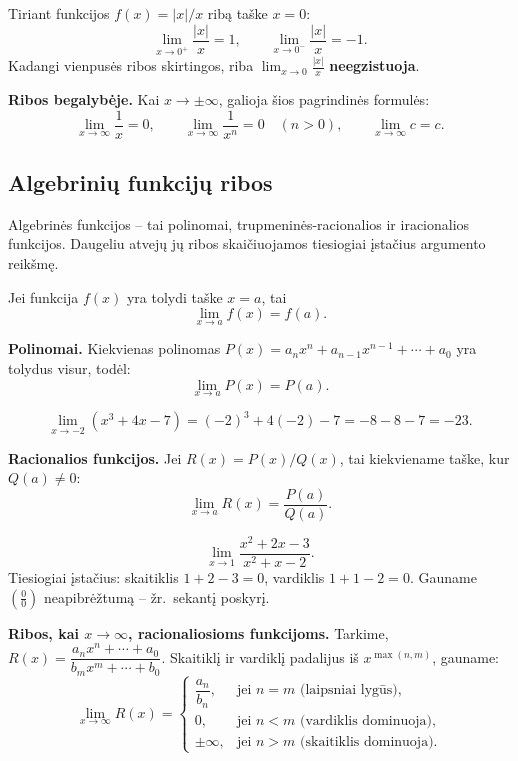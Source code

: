 \begin{example}
Tiriant funkcijos $f(x) = |x|/x$ ribą taške $x = 0$:
\[
  \lim_{x \to 0^+} \frac{|x|}{x} = 1, \qquad \lim_{x \to 0^-} \frac{|x|}{x} = -1.
\]
Kadangi vienpusės ribos skirtingos, riba $\lim_{x \to 0} \frac{|x|}{x}$ \textbf{neegzistuoja}.
\end{example}

\textbf{Ribos begalybėje.} Kai $x \to \pm\infty$, galioja šios pagrindinės formulės:
\[
  \lim_{x \to \infty} \frac{1}{x} = 0, \qquad
  \lim_{x \to \infty} \frac{1}{x^n} = 0 \quad (n > 0), \qquad
  \lim_{x \to \infty} c = c.
\]

\subsection{Algebrinių funkcijų ribos}

Algebrinės funkcijos -- tai polinomai, trupmeninės-racionalios ir iracionalios funkcijos.
Daugeliu atvejų jų ribos skaičiuojamos tiesiogiai įstačius argumento reikšmę.

\begin{theorem}
Jei funkcija $f(x)$ yra tolydi taške $x = a$, tai
\[
  \lim_{x \to a} f(x) = f(a).
\]
\end{theorem}

\textbf{Polinomai.} Kiekvienas polinomas $P(x) = a_n x^n + a_{n-1}x^{n-1} + \cdots + a_0$
yra tolydus visur, todėl:
\[
  \lim_{x \to a} P(x) = P(a).
\]

\begin{example}
\[
  \lim_{x \to -2}(x^3 + 4x - 7) = (-2)^3 + 4(-2) - 7 = -8 - 8 - 7 = -23.
\]
\end{example}

\textbf{Racionalios funkcijos.} Jei $R(x) = P(x)/Q(x)$, tai kiekviename taške, kur
$Q(a) \neq 0$:
\[
  \lim_{x \to a} R(x) = \frac{P(a)}{Q(a)}.
\]

\begin{example}
\[
  \lim_{x \to 1} \frac{x^2 + 2x - 3}{x^2 + x - 2}.
\]
Tiesiogiai įstačius: skaitiklis $1 + 2 - 3 = 0$, vardiklis $1 + 1 - 2 = 0$.
Gauname $\left(\frac{0}{0}\right)$ neapibrėžtumą -- žr.\ sekantį poskyrį.
\end{example}

\textbf{Ribos, kai $x \to \infty$, racionaliosioms funkcijoms.}
Tarkime, $R(x) = \dfrac{a_n x^n + \cdots + a_0}{b_m x^m + \cdots + b_0}$.
Skaitiklį ir vardiklį padalijus iš $x^{\max(n,m)}$, gauname:
\[
  \lim_{x \to \infty} R(x) =
  \begin{cases}
    \dfrac{a_n}{b_n}, & \text{jei } n = m \text{ (laipsniai lygūs)},\\[8pt]
    0,               & \text{jei } n < m \text{ (vardiklis dominuoja)},\\[4pt]
    \pm\infty,       & \text{jei } n > m \text{ (skaitiklis dominuoja)}.
  \end{cases}
\]

